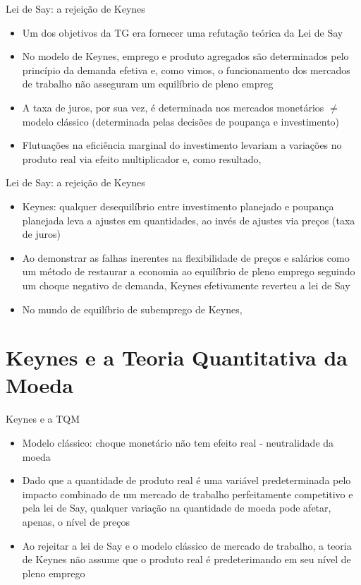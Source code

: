 \documentclass[10pt]{beamer}
\begin{document}
\begin{frame}{Lei de Say: a rejeição de Keynes}
    \begin{itemize}
        \item Um dos objetivos da TG era fornecer uma refutação teórica da Lei de Say
        \bigskip
        \item No modelo de Keynes, emprego e produto agregados são determinados pelo princípio da demanda efetiva e, como vimos, o funcionamento dos mercados de trabalho não asseguram um equilíbrio de pleno empreg
        \bigskip
        \item A taxa de juros, por sua vez, é determinada nos mercados monetários $\neq$ modelo clássico (determinada pelas decisões de poupança e investimento)
        \bigskip
        \item Flutuações na eficiência marginal do investimento levariam a variações no produto real via efeito multiplicador e, como resultado, 
    \end{itemize}
\end{frame}

\begin{frame}{Lei de Say: a rejeição de Keynes}
    \begin{itemize}
        \item Keynes: qualquer desequilíbrio entre investimento planejado e poupança planejada leva a ajustes em quantidades, ao invés de ajustes via preços (taxa de juros)
        \bigskip
        \item Ao demonstrar as falhas inerentes na flexibilidade de preços e salários como um método de restaurar a economia ao equilíbrio de pleno emprego seguindo um choque negativo de demanda, Keynes efetivamente reverteu a lei de Say
        \bigskip
        \item No mundo de equilíbrio de subemprego de Keynes, 
    \end{itemize}
\end{frame}


\section{Keynes e a Teoria Quantitativa da Moeda}
\begin{frame}{Keynes e a TQM}
    \begin{itemize}
        \item Modelo clássico: choque monetário não tem efeito real - neutralidade da moeda
        \bigskip
        \item Dado que a quantidade de produto real é uma variável predeterminada pelo impacto combinado de um mercado de trabalho perfeitamente competitivo e pela lei de Say, qualquer variação na quantidade de moeda pode afetar, apenas, o nível de preços
        \bigskip
        \item Ao rejeitar a lei de Say e o modelo clássico de mercado de trabalho, a teoria de Keynes não assume que o produto real é predeterimando em seu nível de pleno emprego
    \end{itemize}
\end{frame}
\end{document}
